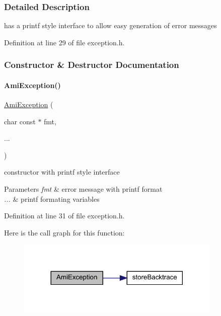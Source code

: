 \subsubsection{Detailed Description}
has a printf style interface to allow easy generation of error messages 

Definition at line 29 of file exception.\+h.



\subsubsection{Constructor \& Destructor Documentation}
\mbox{\label{classamici_1_1_ami_exception_a002ee872acedd472df0550357a67393c}} 
\paragraph{\texorpdfstring{Ami\+Exception()}{AmiException()}\hspace{0.1cm}{\footnotesize\ttfamily [1/2]}}
{\footnotesize\ttfamily \mbox{\hyperlink{classamici_1_1_ami_exception}{Ami\+Exception}} (\begin{DoxyParamCaption}\item[{char const $\ast$}]{fmt,  }\item[{}]{... }\end{DoxyParamCaption})}

constructor with printf style interface 
\begin{DoxyParams}{Parameters}
{\em fmt} & error message with printf format \\
\hline
{\em ...} & printf formating variables\\
\hline
\end{DoxyParams}


Definition at line 31 of file exception.\+h.

Here is the call graph for this function\+:
\nopagebreak
\begin{figure}[H]
\begin{center}
\leavevmode
\includegraphics[width=276pt]{classamici_1_1_ami_exception_a002ee872acedd472df0550357a67393c_cgraph}
\end{center}
\end{figure}
\mbox{\label{classamici_1_1_ami_exception_a0e9ee88cdcbd1965e44d2d94cc6eb16e}} 
